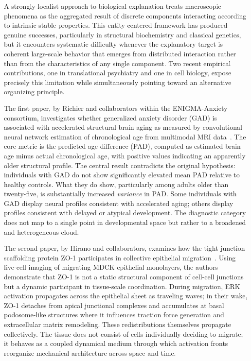 \documentclass[11pt,a4paper]{article}
\theoremstyle{plain}
\theoremstyle{definition}
\begin{document}
A strongly localist approach to biological explanation treats macroscopic phenomena as
the aggregated result of discrete components interacting according to intrinsic stable
properties. This entity-centered framework has produced genuine successes, particularly
in structural biochemistry and classical genetics, but it encounters systematic difficulty
whenever the explanatory target is coherent large-scale behavior that emerges from
distributed interaction rather than from the characteristics of any single component.
Two recent empirical contributions, one in translational psychiatry and one in cell
biology, expose precisely this limitation while simultaneously pointing toward an
alternative organizing principle.

The first paper, by Richier and collaborators within the ENIGMA-Anxiety consortium,
investigates whether generalized anxiety disorder (GAD) is associated with accelerated
structural brain aging as measured by convolutional neural network estimation of
chronological age from multimodal MRI data~\cite{Richier2026}. The core metric is the
predicted age difference (PAD), computed as estimated brain age minus actual chronological
age, with positive values indicating an apparently older structural profile. The central
result contradicts the original hypothesis: individuals with GAD do not show significantly
elevated mean PAD relative to healthy controls. What they do show, particularly among
adults older than twenty-five, is substantially increased \emph{variance} in PAD.
Some individuals with GAD display neural profiles consistent with accelerated aging;
others display profiles consistent with delayed or atypical development. The diagnostic
category does not map to a single point in developmental space but rather to a broadened
and heterogeneous cloud.

The second paper, by Hirano and collaborators, examines how the tight-junction scaffolding
protein ZO-1 participates in collective epithelial migration~\cite{Hirano2026}. Using
live-cell imaging of migrating MDCK epithelial monolayers, the authors demonstrate that
ZO-1 is not a static structural component of cell-cell junctions but a dynamic participant
in tissue-scale coordination. During migration, ERK activation propagates across the
epithelial sheet as traveling waves; in their wake, ZO-1 detaches from apical junctional
complexes and accumulates at basal podosome-like structures where it influences traction
force generation and extracellular matrix remodeling. These redistributions themselves
propagate collectively. The tissue does not consist of cells individually deciding to
migrate; it behaves as a coupled dynamical medium through which activation fronts
reorganize mechanical architecture across space and time.
\end{document}
